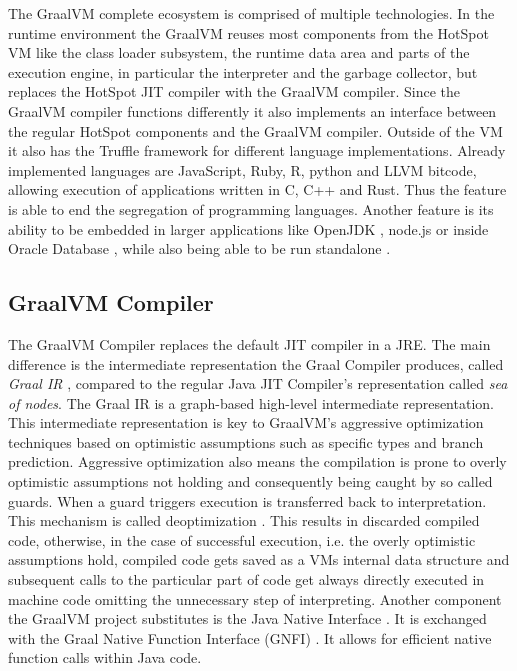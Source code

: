 The GraalVM complete ecosystem is comprised of multiple technologies. In the runtime environment the GraalVM reuses most components from the HotSpot VM like the class loader subsystem, the runtime data area and parts of the execution engine, in particular the interpreter and the garbage collector, but replaces the HotSpot JIT compiler with the GraalVM compiler. Since the GraalVM compiler functions differently it also implements an interface between the regular HotSpot components and the GraalVM compiler. Outside of the VM it also has the Truffle framework for different language implementations. Already implemented languages are JavaScript, Ruby, R, python and LLVM bitcode, allowing execution of applications written in C, C++ and Rust. Thus the feature is able to end the segregation of programming languages. Another feature is its ability to be embedded in larger applications like OpenJDK \cite{openjdk}, node.js \cite{nodejs} or inside Oracle Database \cite{oracleDatabase}, while also being able to be run standalone \cite{graalVMStart}.

\subsection{GraalVM Compiler}\label{sec:graalcomp}
The GraalVM Compiler replaces the default JIT compiler in a JRE. The main difference is the intermediate representation the Graal Compiler produces, called \emph{Graal IR} \cite{inproceedings}, compared to the regular Java JIT Compiler's representation called \emph{sea of nodes}. The Graal IR is a graph-based high-level intermediate representation. This intermediate representation is key to GraalVM's aggressive optimization techniques based on optimistic assumptions such as specific types and branch prediction. Aggressive optimization also means the compilation is prone to overly optimistic assumptions not holding and consequently being caught by so called guards. When a guard triggers execution is transferred back to interpretation. This mechanism is called deoptimization \cite{ChambDeopt}. This results in discarded compiled code, otherwise, in the case of successful execution, i.e. the overly optimistic assumptions hold, compiled code gets saved as a VMs internal data structure and subsequent calls to the particular part of code get always directly executed in machine code omitting the unnecessary step of interpreting. Another component the GraalVM project substitutes is the Java Native Interface \cite{Lindholm}. It is exchanged with the Graal Native Function Interface (GNFI) \cite{grimmerNative}. It allows for efficient native function calls within Java code.

